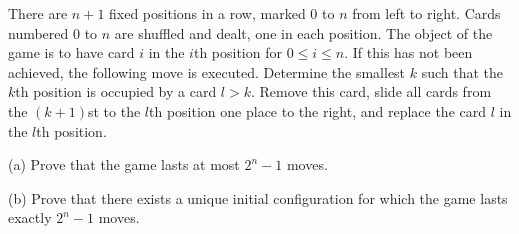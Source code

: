 There are $n+1$ fixed positions in a row, marked $0$ to $n$ from left to right. Cards numbered $0$ to $n$ are shuffled and dealt, one in each position. The object of the game is to have card $i$ in the $i$th position for $0 \leq i \leq n$. If this has not been achieved, the following move is executed. Determine the smallest $k$ such that the $k$th position is occupied by a card $l > k$. Remove this card, slide all cards from the $(k+1)$st to the $l$th position one place to the right, and replace the card $l$ in the $l$th position.

(a) Prove that the game lasts at most $2^n - 1$ moves.

(b) Prove that there exists a unique initial configuration for which the game lasts exactly $2^n - 1$ moves.
